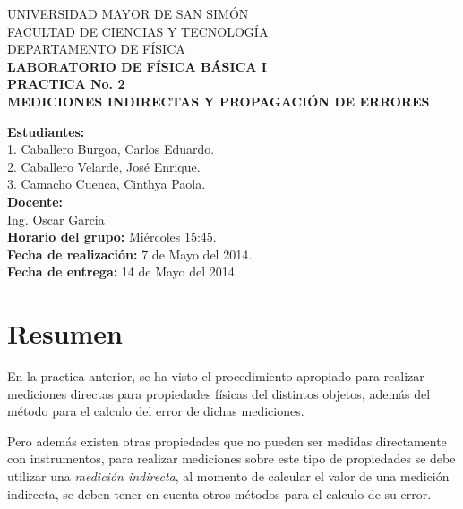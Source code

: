 \documentclass[letter,twoside,11pt]{article}
\newcommand{\blankpage}{
\newpage
\thispagestyle{empty}
\mbox{}
\newpage
}
\begin{document}
\begin{titlepage}
\begin{center}
{\Large UNIVERSIDAD MAYOR DE SAN SIMÓN}\\
\vspace*{0.15cm}
{\large FACULTAD DE CIENCIAS Y TECNOLOGÍA}\\
\vspace*{0.10cm}
DEPARTAMENTO DE FÍSICA\\
\vspace*{3.0cm}
{\Large \textbf{LABORATORIO DE FÍSICA BÁSICA I}}\\
\vspace*{0.3cm}
{\Large \textbf{PRACTICA No. 2}}\\
\vspace*{3.5cm}
{\Large \textbf{MEDICIONES INDIRECTAS Y PROPAGACIÓN DE ERRORES}}\\
\end{center}

\vspace*{6.0cm}
\leftskip=7.95cm
\noindent
\textbf{Estudiantes:}\\
1. Caballero Burgoa, Carlos Eduardo.\\
2. Caballero Velarde, José Enrique.\\
3. Camacho Cuenca, Cinthya Paola.\\
\newline
\textbf{Docente:}\\
Ing. Oscar Garcia\\
\newline
\textbf{Horario del grupo:} Miércoles 15:45.\\
\textbf{Fecha de realización:} 7 de Mayo del 2014.\\
\textbf{Fecha de entrega:} 14 de Mayo del 2014.\\

\end{titlepage}

\blankpage

\section{Resumen}
En la practica anterior, se ha visto el procedimiento apropiado para realizar
mediciones directas para propiedades físicas del distintos objetos, además del
método para el calculo del error de dichas mediciones.

Pero además existen otras propiedades que no pueden ser medidas directamente con
instrumentos, para realizar mediciones sobre este tipo de propiedades se debe
utilizar una \emph{medición indirecta}, al momento de calcular el valor de una
medición indirecta, se deben tener en cuenta otros métodos para el calculo de su
error.
\end{document}

